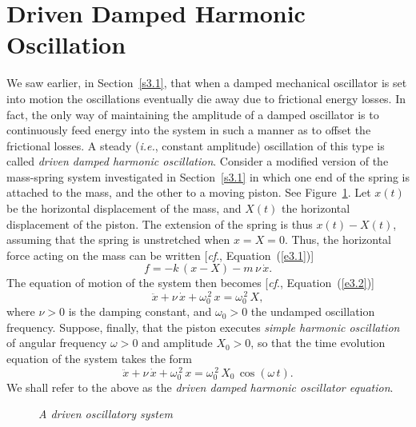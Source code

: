 \section{Driven Damped Harmonic Oscillation}\label{s3.4}
We saw earlier, in Section~\ref{s3.1}, that when a damped mechanical oscillator is set into motion the oscillations
eventually die away due to frictional energy losses. In fact, the only way of maintaining
the amplitude  of a damped oscillator is to continuously  feed energy into the system in such a
manner as
to offset the frictional losses. A steady  ({\em i.e.}, constant amplitude) oscillation  of this type is called  {\em driven damped harmonic oscillation}. 
Consider a modified version of the mass-spring system investigated in Section~\ref{s3.1} in which one end of the spring is
attached to the mass, and the other to a moving piston. See Figure~\ref{f3.3}.
Let $x(t)$ be the horizontal displacement of the mass, and $X(t)$ the horizontal
displacement of the piston. The extension of the spring is thus $x(t)-X(t)$, assuming
that the spring is unstretched when $x=X=0$. Thus, the horizontal force acting
on the mass can be written [{\em cf}., Equation~(\ref{e3.1})]
\begin{equation}
f = - k\,(x-X)-m\,\nu\,\dot{x}.
\end{equation}
The equation of motion of the system then becomes [{\em cf}., Equation~(\ref{e3.2})]
\begin{equation}
\ddot{x} + \nu\,\dot{x} + \omega_0^{\,2}\,x = \omega_0^{\,2}\,X,
\end{equation}
where $\nu>0$ is the damping constant, and $\omega_0>0$ the undamped oscillation frequency. 
Suppose, finally, that the piston  executes {\em simple harmonic oscillation}\/ of
angular frequency $\omega>0$ and amplitude $X_0>0$, so that the time evolution
equation of the system takes the form
\begin{equation}\label{e3.40}
\ddot{x} + \nu\,\dot{x} + \omega_0^{\,2}\,x = \omega_0^{\,2}\,X_0\,\cos(\omega\,t).
\end{equation}
We shall refer to the above as the {\em driven damped harmonic oscillator equation}. 

\begin{figure}
\centerline{}
\caption{\em A driven oscillatory system}\label{f3.3}   
\end{figure}

